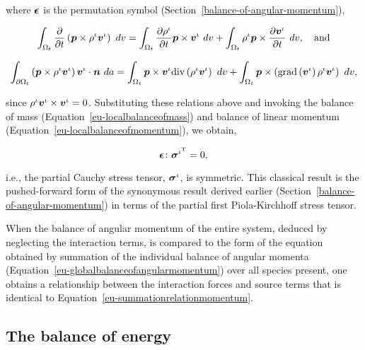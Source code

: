 \noindent where $\mbox{\boldmath$\epsilon$}$ is the permutation symbol
(Section~\ref{balance-of-angular-momentum}),

\begin{displaymath}
\int_{\Omega_{t}}
\frac{\partial}{\partial t}\left( \bp \times \rho^{\iota}
\bv^{\iota}\right)\ dv =
\int_{\Omega_{t}} \frac{\partial \rho^{\iota}} {\partial t}
\bp \times \bv^{\iota}\ dv + \int_{\Omega_{t}} \rho^{\iota} \bp \times 
\frac{\partial \bv^{\iota}} {\partial t}\ dv,\quad\mathrm{and}
\end{displaymath}

\begin{displaymath}
\int_{\partial \Omega_{t}} \left(\bp
  \times \rho^{\iota} 
  \bv^{\iota}\right) \bv^{\iota} \cdot \bn\ da = 
\int_{\Omega_{t}}\bp \times \bv^{\iota} \mathrm{div}
\left(\rho^{\iota}\bv^{\iota}\right)\ dv + \int_{\Omega_{t}}\bp \times
\left(\mathrm{grad}\left(\bv^{\iota}\right)\rho^{\iota}\bv^{\iota}\right)\ dv,
\end{displaymath}

\noindent since $\rho^{\iota} \mbox{\boldmath$ v$}^{\iota}\times\mbox{\boldmath$ v$}^{\iota} =
0$. Substituting these relations above and invoking the balance of
mass (Equation~\ref{eu-localbalanceofmass}) and balance of linear
momentum (Equation~\ref{eu-localbalanceofmomentum}), we obtain,

\begin{equation}
\mbox{\boldmath$\epsilon$}\colon\mbox{\boldmath$\sigma$}^{\iota^{\mathrm{T}}} = 0,
\label{eu-localbalanceofangularmomentum}
\end{equation}

\noindent i.e., the partial Cauchy stress tensor, $\mbox{\boldmath$\sigma$}^{\iota}$,
is symmetric. This classical result is the pushed-forward form of
the synonymous result derived earlier
(Section~\ref{balance-of-angular-momentum}) in terms of the partial
first Piola-Kirchhoff stress tensor.

When the balance of angular momentum of the entire system, deduced by
neglecting the interaction terms, is compared to the form of the
equation obtained by summation of the individual balance of angular
momenta (Equation~\ref{eu-globalbalanceofangularmomentum}) over all
species present, one obtains a relationship between the interaction
forces and source terms that is identical to
Equation~\ref{eu-summationrelationmomentum}.

\subsection{The balance of energy}
\label{eu-balance-of-energy}

